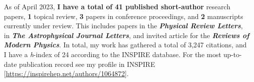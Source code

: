 \documentclass[10pt]{article}
\newcommand{\blankline}{\quad\pagebreak[3]}
\begin{document}
    As of April 2023, \textbf{I have a total of 41 published short-author}
    research papers, \textbf{1} topical review, \textbf{3} papers in conference
    proceedings, and \textbf{2} manuscripts currently under review.
    This includes {} papers in the \textbf{\emph{Physical Review
    Letters}}, {} in \textbf{\emph{The Astrophysical Journal
    Letters}}, and {} invited article for the \textbf{\emph{Reviews
    of Modern Physics}}.
    In total, my work has gathered a total of 3,247 citations, and I have a
    \emph{h}-index of 24 according to the INSPIRE database.
    For the most up-to-date publication record see my profile in INSPIRE
    [\href{https://inspirehep.net/authors/1064872}{https://inspirehep.net/authors/1064872}].

	\blankline
\end{document}
